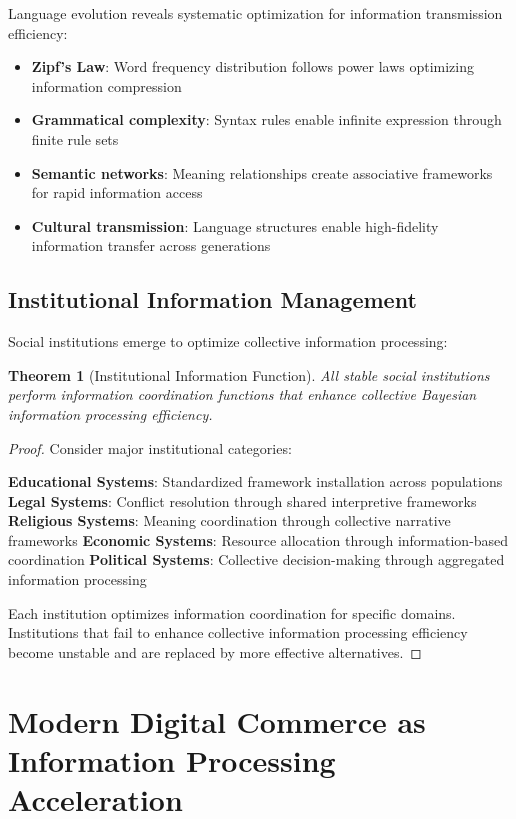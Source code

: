 \documentclass[12pt,a4paper]{article}
\newtheorem{theorem}{Theorem}
\begin{document}
Language evolution reveals systematic optimization for information transmission efficiency:

\begin{itemize}
\item \textbf{Zipf's Law}: Word frequency distribution follows power laws optimizing information compression
\item \textbf{Grammatical complexity}: Syntax rules enable infinite expression through finite rule sets
\item \textbf{Semantic networks}: Meaning relationships create associative frameworks for rapid information access
\item \textbf{Cultural transmission}: Language structures enable high-fidelity information transfer across generations
\end{itemize}

\subsection{Institutional Information Management}

Social institutions emerge to optimize collective information processing:

\begin{theorem}[Institutional Information Function]
All stable social institutions perform information coordination functions that enhance collective Bayesian information processing efficiency.
\end{theorem}

\begin{proof}
Consider major institutional categories:

\textbf{Educational Systems}: Standardized framework installation across populations
\textbf{Legal Systems}: Conflict resolution through shared interpretive frameworks  
\textbf{Religious Systems}: Meaning coordination through collective narrative frameworks
\textbf{Economic Systems}: Resource allocation through information-based coordination
\textbf{Political Systems}: Collective decision-making through aggregated information processing

Each institution optimizes information coordination for specific domains. Institutions that fail to enhance collective information processing efficiency become unstable and are replaced by more effective alternatives.
\end{proof}

\section{Modern Digital Commerce as Information Processing Acceleration}
\end{document}
